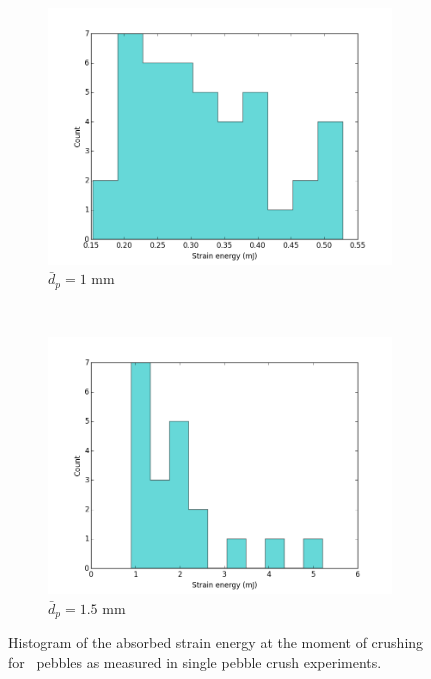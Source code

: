 \begin{figure}
        \centering
        \begin{subfigure}[b]{\doubleimagewidth}
                \includegraphics[width=\textwidth]{chapters/figures/nfri-1mm-w-histogram.png}
                \caption{$\bar{d}_p = 1$ mm}
                \label{fig:nfri-1-w-hist}
        \end{subfigure}
        ~
        \begin{subfigure}[b]{\doubleimagewidth}
                \includegraphics[width=\textwidth]{chapters/figures/nfri-1.5mm-w-histogram.png}
                \caption{$\bar{d}_p = 1.5$ mm}
                \label{fig:nfri-1.5-w-hist}
        \end{subfigure}
        \caption{Histogram of the absorbed strain energy at the moment of crushing for \lit~pebbles as measured in single pebble crush experiments.}\label{fig:nfri-w-hist}
\end{figure}

